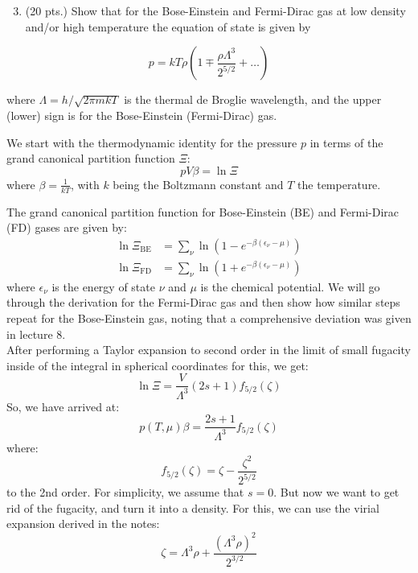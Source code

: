 \documentclass[12pt]{article}
\begin{document}
\section{}
\begin{enumerate}
  \setcounter{enumi}{2}
  \item (20 pts.) Show that for the Bose-Einstein and Fermi-Dirac gas at low density and/or high temperature the equation of state is given by
\end{enumerate}

$$
p=k T \rho\left(1 \mp \frac{\rho \Lambda^{3}}{2^{5 / 2}}+\ldots\right)
$$

where $\Lambda=h / \sqrt{2 \pi m k T}$ is the thermal de Broglie wavelength, and the upper (lower) sign is for the Bose-Einstein (Fermi-Dirac) gas.

We start with the thermodynamic identity for the pressure $p$ in terms of the grand canonical partition function $\Xi$:
\begin{equation}
    pV\beta = \ln \Xi
\end{equation}
where $\beta = \frac{1}{kT}$, with $k$ being the Boltzmann constant and $T$ the temperature.

The grand canonical partition function for Bose-Einstein (BE) and Fermi-Dirac (FD) gases are given by:
\begin{align}
    \ln \Xi_{\text{BE}} &= \sum_{\nu} \ln \left(1 - e^{-\beta(\epsilon_{\nu} - \mu)}\right) \\
    \ln \Xi_{\text{FD}} &= \sum_{\nu} \ln \left(1 + e^{-\beta(\epsilon_{\nu} - \mu)}\right)
\end{align}
where $\epsilon_{\nu}$ is the energy of state $\nu$ and $\mu$ is the chemical potential.
We will go through the derivation for the Fermi-Dirac gas and then show how similar steps repeat for the Bose-Einstein gas, noting that a comprehensive deviation was given in lecture 8.\\
After performing a Taylor expansion to second order in the limit of small fugacity inside of the integral in spherical coordinates for this, we get:
\begin{equation}
\ln \Xi=\frac{V}{\Lambda^3}(2 s+1) f_{5 / 2}(\zeta)
\end{equation}
So, we have arrived at:
\begin{equation}
    p(T, \mu)\beta = \frac{2s+1}{\Lambda^3}f_{5/2}(\zeta)
\end{equation}
where:
\begin{equation}
f_{5 / 2}(\zeta)=\zeta-\frac{\zeta^2}{2^{5 / 2}}
\end{equation}
to the 2nd order.
For simplicity, we assume that $s=0$.
But now we want to get rid of the fugacity, and turn it into a density. For this, we can use the virial expansion derived in the notes:
\begin{equation}
\zeta=\Lambda^3 \rho+\frac{\left(\Lambda^3 \rho\right)^2}{2^{3 / 2}}
\end{equation}
\end{document}
